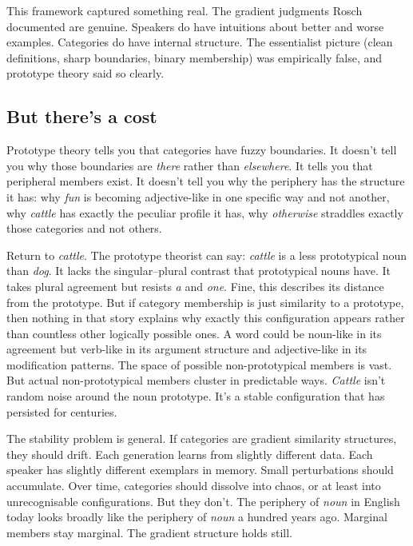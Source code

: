 This framework captured something real. The gradient judgments Rosch documented are genuine. Speakers do have intuitions about better and worse examples. Categories do have internal structure. The essentialist picture (clean definitions, sharp boundaries, binary membership) was empirically false, and prototype theory said so clearly.

\subsection*{But there's a cost}

Prototype theory tells you that categories have fuzzy boundaries. It doesn't tell you why those boundaries are \textit{there} rather than \textit{elsewhere}. It tells you that peripheral members exist. It doesn't tell you why the periphery has the structure it has: why \textit{fun} is becoming adjective-like in one specific way and not another, why \textit{cattle} has exactly the peculiar profile it has, why \textit{otherwise} straddles exactly those categories and not others.

Return to \textit{cattle}. The prototype theorist can say: \textit{cattle} is a less prototypical noun than \textit{dog}. It lacks the singular–plural contrast that prototypical nouns have. It takes plural agreement but resists \textit{a} and \textit{one}. Fine, this describes its distance from the prototype. But if category membership is just similarity to a prototype, then nothing in that story explains why exactly this configuration appears rather than countless other logically possible ones. A word could be noun-like in its agreement but verb-like in its argument structure and adjective-like in its modification patterns. The space of possible non-prototypical members is vast. But actual non-prototypical members cluster in predictable ways. \textit{Cattle} isn't random noise around the noun prototype. It's a stable configuration that has persisted for centuries.

The stability problem is general. If categories are gradient similarity structures, they should drift. Each generation learns from slightly different data. Each speaker has slightly different exemplars in memory. Small perturbations should accumulate. Over time, categories should dissolve into chaos, or at least into unrecognisable configurations. But they don't. The periphery of \textit{noun} in English today looks broadly like the periphery of \textit{noun} a hundred years ago. Marginal members stay marginal. The gradient structure holds still.

